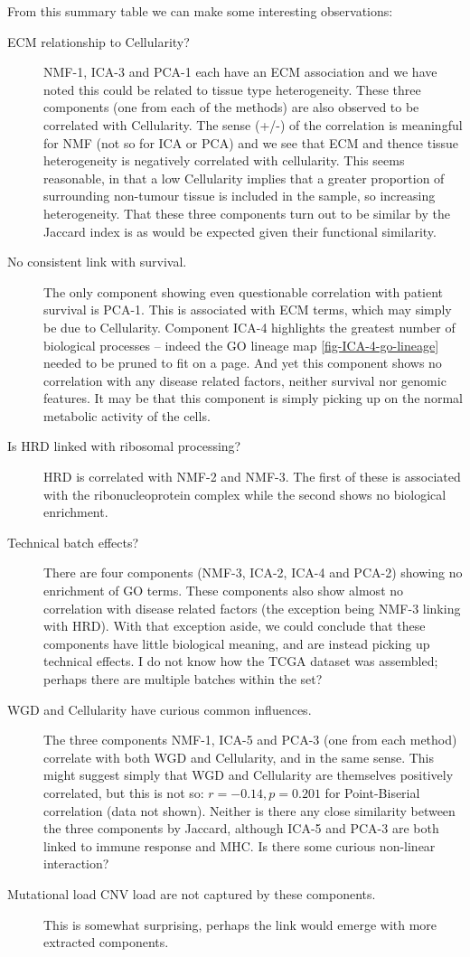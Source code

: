\documentclass[tikz, 11pt,a4paper,oneside,fleqn]{article}
\begin{document}
From this summary table we can make some interesting observations:
\begin{description}
\item[ECM relationship to Cellularity?]
NMF-1, ICA-3 and PCA-1 each have an ECM association and we have noted this could be related to tissue type heterogeneity.   These three components (one from each of the methods) are also observed to be correlated with Cellularity.  The sense (+/-) of the correlation is meaningful for NMF (not so for ICA or PCA) and we see that ECM and thence tissue heterogeneity is negatively correlated with cellularity. This seems reasonable, in that a low Cellularity implies that a greater proportion of surrounding non-tumour tissue is included in the sample, so increasing heterogeneity.   That these three components turn out to be similar by the Jaccard index is as would be expected given their functional similarity.
\item[No consistent link with survival.]
The only component showing even questionable correlation with patient survival is  PCA-1.  This is associated with ECM terms, which may simply be due to Cellularity.  
Component ICA-4 highlights the greatest number of biological processes -- indeed the GO lineage map \ref{fig-ICA-4-go-lineage} needed to be pruned to fit on a page.  And yet this component shows no correlation with any disease related factors, neither survival nor genomic features.  It may be that this component is simply picking up on the normal metabolic activity of the cells.
\item[Is HRD linked with ribosomal processing?]  HRD is correlated with NMF-2 and NMF-3.  The first of these is associated with the ribonucleoprotein complex while the second shows no biological enrichment.
\item[Technical batch effects?]
There are four components (NMF-3, ICA-2, ICA-4 and PCA-2) showing no enrichment of GO terms.  These components also show almost no correlation with disease related factors (the exception being NMF-3 linking with HRD).  With that exception aside, we could conclude that these components have little biological meaning, and are instead picking up technical effects.  I do not know how the TCGA dataset was assembled; perhaps there are multiple batches within the set?
\item[WGD and Cellularity have curious common influences.]
The three components NMF-1, ICA-5 and PCA-3 (one from each method) correlate with both WGD and Cellularity, and in the same sense. 
This might suggest simply that WGD and Cellularity are themselves positively correlated, but this is not so: $r=-0.14, p=0.201$ for Point-Biserial correlation (data not shown).  Neither is there any close similarity between the three components by Jaccard, although ICA-5 and PCA-3 are both linked to immune response and MHC.   Is there some curious non-linear interaction?
\item[Mutational load CNV load are not captured by these components.]  This is somewhat surprising, perhaps the link would emerge with more extracted components.
\end{description} 
\end{document}
